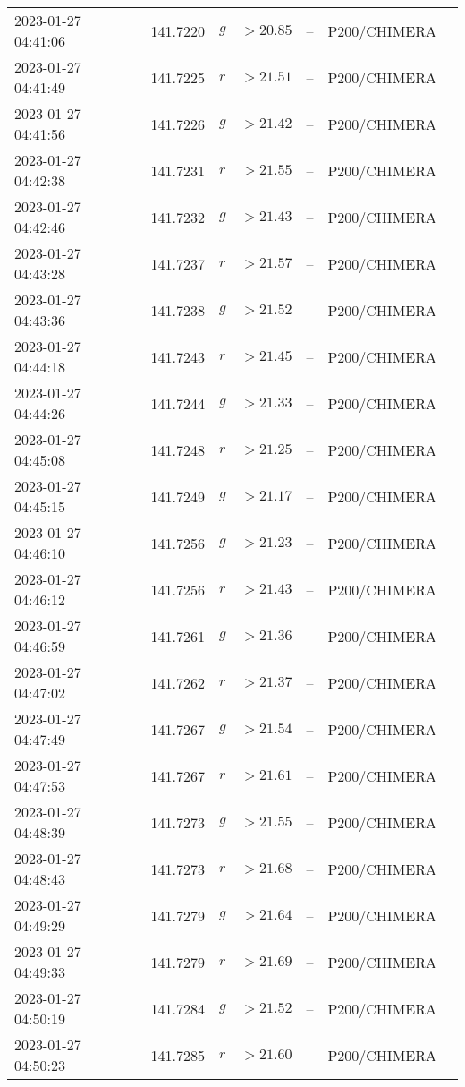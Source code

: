 \documentclass{nature_plusfigure}
\begin{document}
\begin{supplement}
\begin{center}
\begin{longtable}{lllllll}
2023-01-27 04:41:06 & 141.7220 & $g$ & $>20.85$ & -- & P200/CHIMERA &  \\ 
2023-01-27 04:41:49 & 141.7225 & $r$ & $>21.51$ & -- & P200/CHIMERA &  \\ 
2023-01-27 04:41:56 & 141.7226 & $g$ & $>21.42$ & -- & P200/CHIMERA &  \\ 
2023-01-27 04:42:38 & 141.7231 & $r$ & $>21.55$ & -- & P200/CHIMERA &  \\ 
2023-01-27 04:42:46 & 141.7232 & $g$ & $>21.43$ & -- & P200/CHIMERA &  \\ 
2023-01-27 04:43:28 & 141.7237 & $r$ & $>21.57$ & -- & P200/CHIMERA &  \\ 
2023-01-27 04:43:36 & 141.7238 & $g$ & $>21.52$ & -- & P200/CHIMERA &  \\ 
2023-01-27 04:44:18 & 141.7243 & $r$ & $>21.45$ & -- & P200/CHIMERA &  \\ 
2023-01-27 04:44:26 & 141.7244 & $g$ & $>21.33$ & -- & P200/CHIMERA &  \\ 
2023-01-27 04:45:08 & 141.7248 & $r$ & $>21.25$ & -- & P200/CHIMERA &  \\ 
2023-01-27 04:45:15 & 141.7249 & $g$ & $>21.17$ & -- & P200/CHIMERA &  \\ 
2023-01-27 04:46:10 & 141.7256 & $g$ & $>21.23$ & -- & P200/CHIMERA &  \\ 
2023-01-27 04:46:12 & 141.7256 & $r$ & $>21.43$ & -- & P200/CHIMERA &  \\ 
2023-01-27 04:46:59 & 141.7261 & $g$ & $>21.36$ & -- & P200/CHIMERA &  \\ 
2023-01-27 04:47:02 & 141.7262 & $r$ & $>21.37$ & -- & P200/CHIMERA &  \\ 
2023-01-27 04:47:49 & 141.7267 & $g$ & $>21.54$ & -- & P200/CHIMERA &  \\ 
2023-01-27 04:47:53 & 141.7267 & $r$ & $>21.61$ & -- & P200/CHIMERA &  \\ 
2023-01-27 04:48:39 & 141.7273 & $g$ & $>21.55$ & -- & P200/CHIMERA &  \\ 
2023-01-27 04:48:43 & 141.7273 & $r$ & $>21.68$ & -- & P200/CHIMERA &  \\ 
2023-01-27 04:49:29 & 141.7279 & $g$ & $>21.64$ & -- & P200/CHIMERA &  \\ 
2023-01-27 04:49:33 & 141.7279 & $r$ & $>21.69$ & -- & P200/CHIMERA &  \\ 
2023-01-27 04:50:19 & 141.7284 & $g$ & $>21.52$ & -- & P200/CHIMERA &  \\ 
2023-01-27 04:50:23 & 141.7285 & $r$ & $>21.60$ & -- & P200/CHIMERA &  \\ 

\end{longtable}
\end{center}
\end{supplement}
\end{document}
